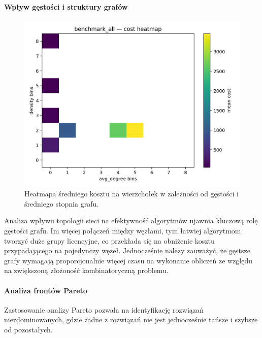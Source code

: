 \paragraph{Wpływ gęstości i struktury grafów}
\begin{figure}[H]
  \centering
  \includegraphics[width=0.7\linewidth]{assets/figures/ba_heatmap_cost.png}
  \caption{Heatmapa średniego kosztu na wierzchołek w zależności od gęstości i średniego stopnia grafu.}
  \label{fig:density_heatmap}
\end{figure}

Analiza wpływu topologii sieci na efektywność algorytmów ujawnia kluczową rolę gęstości grafu. Im więcej połączeń między węzłami, tym łatwiej algorytmom tworzyć duże grupy licencyjne, co przekłada się na obniżenie kosztu przypadającego na pojedynczy węzeł. Jednocześnie należy zauważyć, że gęstsze grafy wymagają proporcjonalnie więcej czasu na wykonanie obliczeń ze względu na zwiększoną złożoność kombinatoryczną problemu.

\paragraph{Analiza frontów Pareto}
Zastosowanie analizy Pareto pozwala na identyfikację rozwiązań niezdominowanych, gdzie żadne z rozwiązań nie jest jednocześnie tańsze i szybsze od pozostałych.


